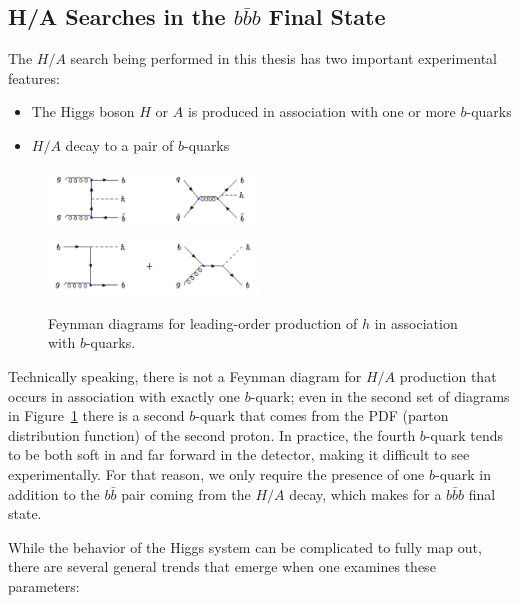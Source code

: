 \subsection{H/A Searches in the $b\bar{b}b$ Final State}
The $H/A$ search being performed in this thesis has two important experimental features:

\begin{itemize}
    \item The Higgs boson $H$ or $A$ is produced in association with one or more $b$-quarks
    \item $H/A$ decay to a pair of $b$-quarks
\end{itemize}

\begin{figure}[H]
	\includegraphics[width=0.5\textwidth]{Theory/FeynmanDiagrams/bbH_FeynmanDiagrams.pdf}		
	\includegraphics[width=0.5\textwidth]{Theory/FeynmanDiagrams/bH_FeynmanDiagrams.pdf}
	\caption{Feynman diagrams for leading-order production of $h$ in association with $b$-quarks.  \label{fig:fd}}
\end{figure}

Technically speaking, there is not a Feynman diagram for $H/A$ 
production that occurs in association with exactly one $b$-quark; even in 
the second set of diagrams in Figure~\ref{fig:fd} there 
is a second $b$-quark that comes from the PDF (parton distribution 
function) of the second proton.  In practice, the fourth $b$-quark 
tends to be both soft in \pt and far forward in the detector, 
making it difficult to see experimentally.  For that reason, we only require the 
presence of one $b$-quark in addition to the $b\bar{b}$ pair 
coming from the $H/A$ decay, which makes for a $b\bar{b}b$ final state.



While the behavior of the Higgs system can be complicated to fully map out, 
there are several general trends that emerge when one examines these parameters:

